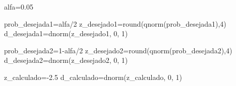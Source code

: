 \documentclass[
]{book}
\newenvironment{Shaded}{\begin{snugshade}}{\end{snugshade}}
\newcommand{\DecValTok}[1]{\textcolor[rgb]{0.00,0.00,0.81}{#1}}
\newcommand{\FloatTok}[1]{\textcolor[rgb]{0.00,0.00,0.81}{#1}}
\newcommand{\FunctionTok}[1]{\textcolor[rgb]{0.00,0.00,0.00}{#1}}
\newcommand{\NormalTok}[1]{#1}
\newcommand{\OtherTok}[1]{\textcolor[rgb]{0.56,0.35,0.01}{#1}}
\newcommand{\SpecialCharTok}[1]{\textcolor[rgb]{0.00,0.00,0.00}{#1}}
\begin{document}
\begin{Shaded}
\begin{Highlighting}[]
\NormalTok{alfa}\OtherTok{=}\FloatTok{0.05}

\NormalTok{prob\_desejada1}\OtherTok{=}\NormalTok{alfa}\SpecialCharTok{/}\DecValTok{2}
\NormalTok{z\_desejado1}\OtherTok{=}\FunctionTok{round}\NormalTok{(}\FunctionTok{qnorm}\NormalTok{(prob\_desejada1),}\DecValTok{4}\NormalTok{)}
\NormalTok{d\_desejada1}\OtherTok{=}\FunctionTok{dnorm}\NormalTok{(z\_desejado1, }\DecValTok{0}\NormalTok{, }\DecValTok{1}\NormalTok{)}

\NormalTok{prob\_desejada2}\OtherTok{=}\DecValTok{1}\SpecialCharTok{{-}}\NormalTok{alfa}\SpecialCharTok{/}\DecValTok{2}
\NormalTok{z\_desejado2}\OtherTok{=}\FunctionTok{round}\NormalTok{(}\FunctionTok{qnorm}\NormalTok{(prob\_desejada2),}\DecValTok{4}\NormalTok{)}
\NormalTok{d\_desejada2}\OtherTok{=}\FunctionTok{dnorm}\NormalTok{(z\_desejado2, }\DecValTok{0}\NormalTok{, }\DecValTok{1}\NormalTok{)}

\NormalTok{z\_calculado}\OtherTok{=}\SpecialCharTok{{-}}\FloatTok{2.5}
\NormalTok{d\_calculado}\OtherTok{=}\FunctionTok{dnorm}\NormalTok{(z\_calculado, }\DecValTok{0}\NormalTok{, }\DecValTok{1}\NormalTok{)}



\end{Highlighting}
\end{Shaded}
\end{document}
